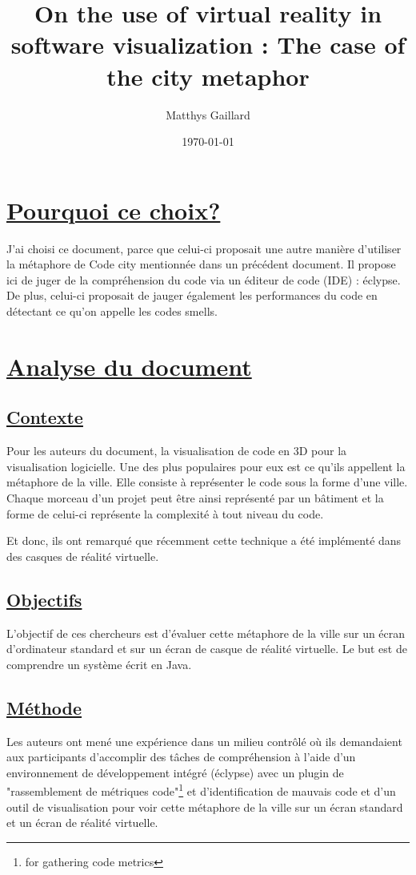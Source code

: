 \documentclass[a4paper,11pt,oneside]{article}
\title{On the use of virtual reality in software visualization : The case of the city metaphor}
\author{Matthys Gaillard}
\date{\today}
\begin{document}
\maketitle

\section{\ul{Pourquoi ce choix?}}
    \par J'ai choisi ce document\cite{A2}, parce que celui-ci proposait une autre manière d'utiliser la métaphore de Code city mentionnée dans un précédent document. Il propose
    ici de juger de la compréhension du code via un éditeur de code (IDE) : éclypse. De plus, celui-ci proposait de jauger également les performances du code en détectant ce qu'on appelle les codes smells.
\section{\ul{Analyse du document}}
\subsection{\ul{Contexte}} 
    \par Pour les auteurs du document, la visualisation de code en 3D pour la visualisation logicielle. Une des plus populaires pour eux est ce qu'ils appellent 
    la métaphore de la ville. Elle consiste à représenter le code sous la forme d'une ville. Chaque morceau d'un projet peut être ainsi représenté par un bâtiment et la forme de celui-ci représente la complexité à tout niveau du code.
    \par Et donc, ils ont remarqué que récemment cette technique a été implémenté dans des casques de réalité virtuelle.
\subsection{\ul{Objectifs}}
    \par L'objectif de ces chercheurs est d'évaluer cette métaphore de la ville sur un écran d'ordinateur standard et sur un écran de casque de réalité virtuelle. Le but est de comprendre un système écrit en Java.
\subsection{\ul{Méthode}}
    \par Les auteurs ont mené une expérience dans un milieu contrôlé où ils demandaient aux participants d'accomplir des tâches de compréhension à l'aide
    d'un environnement de développement intégré (éclypse) avec un plugin de "rassemblement de métriques code"\footnote{for gathering code metrics} et d'identification de mauvais code et d'un outil de visualisation pour voir cette métaphore de la ville sur un écran standard et un écran de réalité virtuelle.
\end{document}
